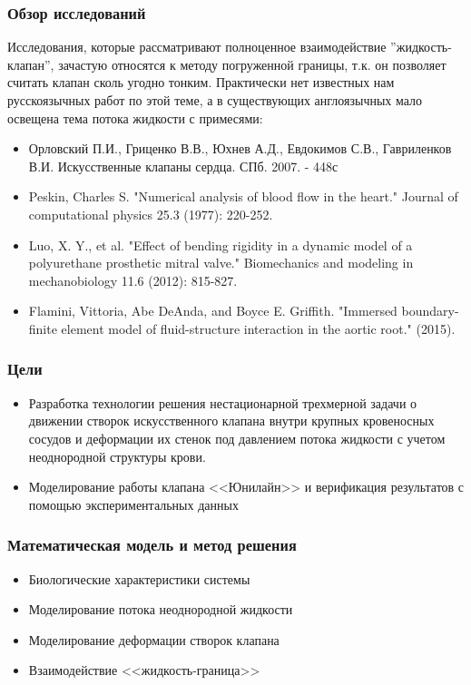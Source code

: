 \documentclass[14pt]{beamer}
\begin{document}
\begin{frame}
\frametitle{Обзор исследований}
    Исследования, которые рассматривают полноценное взаимодействие ''жидкость-клапан'', зачастую относятся 
    к методу погруженной границы, т.к. он позволяет считать клапан сколь угодно тонким. Практически нет
    известных нам русскоязычных работ по этой теме, а в существующих англоязычных мало освещена тема потока
    жидкости с примесями:
    \par
    {\tiny
        \begin{itemize}
            \item[\MVRightarrow] Орловский П.И., Гриценко В.В., Юхнев А.Д., Евдокимов С.В., Гавриленков В.И. Искусственные клапаны сердца. СПб. 2007. - 448с
            \item[\MVRightarrow] Peskin, Charles S. "Numerical analysis of blood flow in the heart." Journal of computational physics 25.3 (1977): 220-252.
            \item[\MVRightarrow] Luo, X. Y., et al. "Effect of bending rigidity in a dynamic model of a polyurethane prosthetic mitral valve." Biomechanics and modeling in mechanobiology 11.6 (2012): 815-827.
            \item[\MVRightarrow] Flamini, Vittoria, Abe DeAnda, and Boyce E. Griffith. "Immersed boundary-finite element model of fluid-structure interaction in the aortic root." (2015).
        \end{itemize}
    }
\end{frame}

\begin{frame}
\frametitle{Цели}
    \begin{itemize}
        \item[\MVRightarrow] Разработка технологии решения нестационарной трехмерной задачи о движении створок искусственного клапана внутри крупных кровеносных сосудов и деформации их стенок под давлением потока жидкости с учетом неоднородной структуры крови.
        \item[\MVRightarrow] Моделирование работы клапана <<Юнилайн>> и верификация результатов с помощью экспериментальных данных
    \end{itemize}
\end{frame}

\begin{frame}
\frametitle{Математическая модель и метод решения}
    \begin{itemize}
        \item[\MVRightarrow] Биологические характеристики системы
        \item[\MVRightarrow] Моделирование потока неоднородной жидкости
        \item[\MVRightarrow] Моделирование деформации створок клапана
        \item[\MVRightarrow] Взаимодействие <<жидкость-граница>>
    \end{itemize}
\end{frame}
\end{document}
